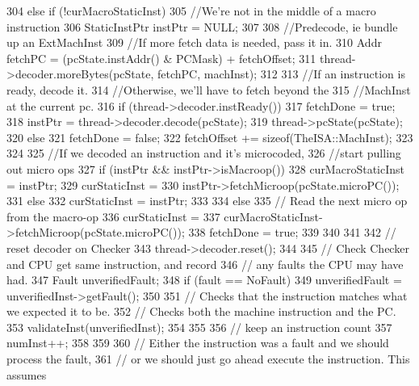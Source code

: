 \begin{DoxyCode}
{{{{{304                 } else if (!curMacroStaticInst) {
305                     //We're not in the middle of a macro instruction
306                     StaticInstPtr instPtr = NULL;
307 
308                     //Predecode, ie bundle up an ExtMachInst
309                     //If more fetch data is needed, pass it in.
310                     Addr fetchPC = (pcState.instAddr() & PCMask) + fetchOffset;
311                     thread->decoder.moreBytes(pcState, fetchPC, machInst);
312 
313                     //If an instruction is ready, decode it.
314                     //Otherwise, we'll have to fetch beyond the
315                     //MachInst at the current pc.
316                     if (thread->decoder.instReady()) {
317                         fetchDone = true;
318                         instPtr = thread->decoder.decode(pcState);
319                         thread->pcState(pcState);
320                     } else {
321                         fetchDone = false;
322                         fetchOffset += sizeof(TheISA::MachInst);
323                     }
324 
325                     //If we decoded an instruction and it's microcoded,
326                     //start pulling out micro ops
327                     if (instPtr && instPtr->isMacroop()) {
328                         curMacroStaticInst = instPtr;
329                         curStaticInst =
330                             instPtr->fetchMicroop(pcState.microPC());
331                     } else {
332                         curStaticInst = instPtr;
333                     }
334                 } else {
335                     // Read the next micro op from the macro-op
336                     curStaticInst =
337                         curMacroStaticInst->fetchMicroop(pcState.microPC());
338                     fetchDone = true;
339                 }
340             }
341         }
342         // reset decoder on Checker
343         thread->decoder.reset();
344 
345         // Check Checker and CPU get same instruction, and record
346         // any faults the CPU may have had.
347         Fault unverifiedFault;
348         if (fault == NoFault) {
349             unverifiedFault = unverifiedInst->getFault();
350 
351             // Checks that the instruction matches what we expected it to be.
352             // Checks both the machine instruction and the PC.
353             validateInst(unverifiedInst);
354         }
355 
356         // keep an instruction count
357         numInst++;
358 
359 
360         // Either the instruction was a fault and we should process the fault,
361         // or we should just go ahead execute the instruction.  This assumes
}}
\end{DoxyCode}
